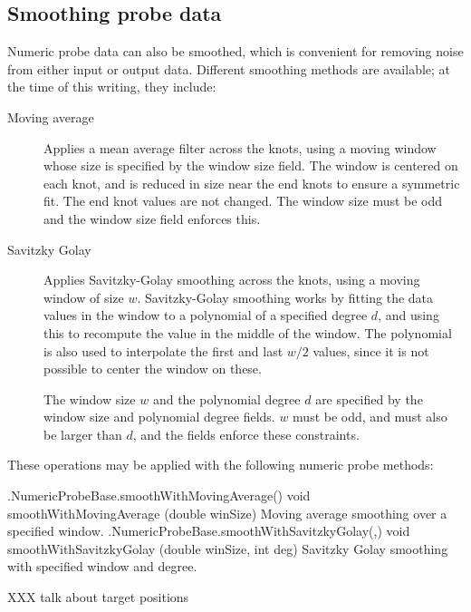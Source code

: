 \subsection{Smoothing probe data}
\label{SmoothingProbeData:sec}

Numeric probe data can also be smoothed, which is convenient for removing noise
from either input or output data. Different smoothing methods are available; at
the time of this writing, they include:

\begin{description}

\item[Moving average] \mbox{}

Applies a mean average filter across the knots, using a moving window
whose size is specified by the {\sf window size} field. The window is
centered on each knot, and is reduced in size near the end knots to
ensure a symmetric fit. The end knot values are not changed.  The
window size must be odd and the {\sf window size} field enforces this.

\item[Savitzky Golay] \mbox{}

Applies Savitzky-Golay smoothing across the knots, using a moving
window of size $w$.  Savitzky-Golay smoothing works by fitting the
data values in the window to a polynomial of a specified degree $d$, and
using this to recompute the value in the middle of the window.  The
polynomial is also used to interpolate the first and last $w/2$
values, since it is not possible to center the window on these.

The window size $w$ and the polynomial degree $d$ are specified by the
{\sf window size} and {\sf polynomial degree} fields. $w$ must be odd,
and must also be larger than $d$, and the fields enforce these
constraints.

\end{description}

These operations may be applied with the following numeric probe
methods:

%
\begin{methodtable}{0.5}{0.5}
\midline
%
\methodentry
{\probes.NumericProbeBase.smoothWithMovingAverage()}%
{void smoothWithMovingAverage (double winSize)}%
{Moving average smoothing over a specified window.}%
%
\methodentry
{\probes.NumericProbeBase.smoothWithSavitzkyGolay(,)}%
{void smoothWithSavitzkyGolay (\brh double winSize, int deg)}%
{Savitzky Golay smoothing with specified window and degree.}%
%
\midline
\end{methodtable}
%

%
\ifdefined\maindoc
\else

\fi

XXX talk about target positions

